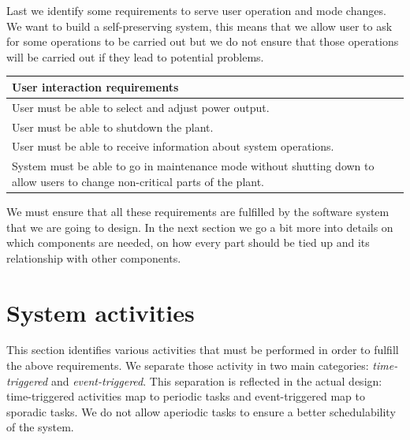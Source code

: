 \documentclass[10pt,a4paper]{report}
\begin{document}
Last we identify some requirements to serve user operation and mode changes. 
We want to build a self-preserving system, this means that we allow user
to ask for some operations to be carried out but we do not ensure that those 
operations will be carried out if they lead to potential problems.
\begin{center}
\begin{tabular}{| p{10cm} |}
\hline
\textbf{User interaction requirements}\\
\hline \hline
User must be able to select and adjust power output.\\
\hline
User must be able to shutdown the plant.\\
\hline
User must be able to receive information about system operations.\\
\hline
System must be able to go in maintenance mode without shutting down to allow 
users to change non-critical parts of the plant.\\
\hline
\end{tabular}
\end{center}

We must ensure that all these requirements are fulfilled by the software 
system that we are going to design. In the next section we go a bit more
into details on which components are needed, on how every part should be tied up 
and its relationship with other components.

\section{System activities}
This section identifies various activities that must be performed in order to 
fulfill the above requirements. We separate those activity in two main 
categories: \emph{time-triggered} and \emph{event-triggered}. This separation is 
reflected in the actual design: time-triggered activities map to periodic 
tasks and event-triggered map to sporadic tasks. We do not allow aperiodic 
tasks to ensure a better schedulability of the system.
\end{document}
